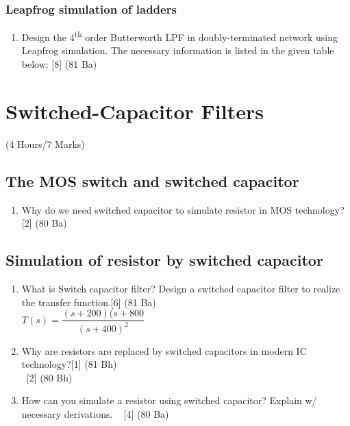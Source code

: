 \documentclass[12pt]{article}
\newcommand{\enter}{\\\textcolor{white}{1}}
\begin{document}
\subsubsection{Leapfrog simulation of ladders}
\begin{enumerate}
\item Design the 4\textsuperscript{th} order Butterworth LPF in doubly-terminated network using Leapfrog simulation. The necessary information is listed in the given table below:\hspace*{20mm} [8] (81 Ba)

\end{enumerate}

\pagebreak
\section{Switched-Capacitor Filters}
\begin{center}(4 Hours/7 Marks)\end{center}
\subsection{The MOS switch and switched capacitor}
\begin{enumerate}
\item Why do we need switched capacitor to simulate resistor in MOS technology?\hfill[2] (80 Ba)
\end{enumerate}
\subsection{Simulation of resistor by switched capacitor}
\begin{enumerate}
\item What is Switch capacitor filter? Design a switched capacitor filter to realize the transfer function.\hfill [6] (81 Ba)\\
$T(s) = \dfrac{(s+200)(s+800}{(s+400)^2}$
\item Why are resistors are replaced by switched capacitors in modern IC technology?\hfill[1] (81 Bh)
\enter\hfill [2] (80 Bh)
\item How can you simulate a resistor using switched capacitor? Explain w/ necessary derivations.
\textcolor{white}{1} \hfill[4] (80 Ba)

\end{enumerate}
\end{document}
